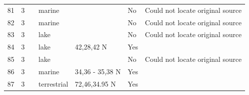 \documentclass[12pt]{article}
\begin{document}
\begin{landscape}
\begin{table}[h!]
{\begin{tabular}{p{2.8cm}p{1.3cm}p{5.5cm}p{2.2cm}p{2.5cm}lp{3.5cm}}
        81    & 3 & \citet{Hatanaka1977}  & marine &       & No    & Could not locate original source \\
        82    & 3 & \citet{Cohen1990} & marine &       & No    & Could not locate original source \\
        83    & 3 & \citet{Cohen1990}  & lake &       & No    & Could not locate original source \\
        84    & 3 & \citet{Wilbur1972}    & lake & 42,28,42 N & Yes   &       \\
        85    & 3 & \citet{Mizuno1982}  & lake &       & No    & Could not locate original source \\
        86    & 3 & \citet{Hogetsu1979}  & marine & 34,36 - 35,38 N & Yes   &       \\
        87    & 3 & \citet{Bradstreet1982}  & terrestrial & 72,46,34.95 N & Yes   &       \\
        \hline
      \end{tabular}}%
      \end{table}

        \newpage


\end{landscape}
\end{document}
